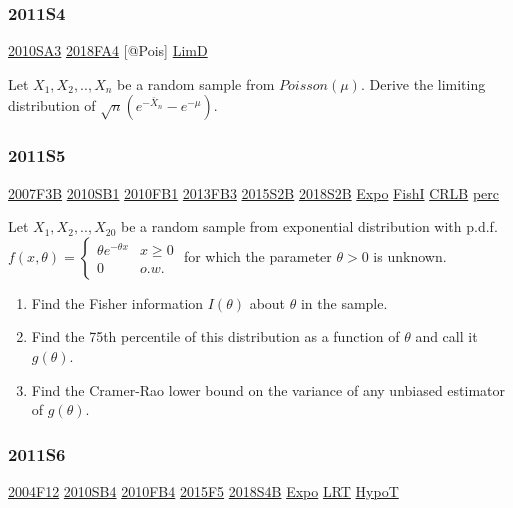 \documentclass[10pt,twocolumn,portrait]{article}
\begin{document}
\hypertarget{s4-2}{%
\subsubsection{2011S4}\label{s4-2}}

\protect\hyperlink{sa3-1}{2010SA3} \protect\hyperlink{fa4-4}{2018FA4}
{[}@Pois{]} \protect\hyperlink{LimD}{LimD}

Let \(X_1,X_2,..,X_n\) be a random sample from \(Poisson(\mu)\). Derive
the limiting distribution of \(\sqrt{n}(e^{-\bar X_n}-e^{-\mu})\).

\hypertarget{s5-2}{%
\subsubsection{2011S5}\label{s5-2}}

\protect\hyperlink{f3b}{2007F3B} \protect\hyperlink{sb1-1}{2010SB1}
\protect\hyperlink{fb1-1}{2010FB1} \protect\hyperlink{fb3-2}{2013FB3}
\protect\hyperlink{s2b-1}{2015S2B} \protect\hyperlink{s2b-2}{2018S2B}
\protect\hyperlink{Expo}{Expo} \protect\hyperlink{section-5}{FishI}
\protect\hyperlink{section-5}{CRLB} \protect\hyperlink{perc}{perc}

Let \(X_1,X_2,..,X_{20}\) be a random sample from exponential
distribution with p.d.f.
\(f(x,\theta)=\begin{cases}\theta e^{-\theta x}& x\ge0\\0& o.w.\end{cases}\)
for which the parameter \(\theta>0\) is unknown.

\begin{enumerate}
\def\labelenumi{(\alph{enumi})}
\item
  Find the Fisher information \(I(\theta)\) about \(\theta\) in the
  sample.
\item
  Find the 75th percentile of this distribution as a function of
  \(\theta\) and call it \(g(\theta)\).
\item
  Find the Cramer-Rao lower bound on the variance of any unbiased
  estimator of \(g(\theta)\).
\end{enumerate}

\hypertarget{s6-2}{%
\subsubsection{2011S6}\label{s6-2}}

\protect\hyperlink{f12}{2004F12} \protect\hyperlink{sb4}{2010SB4}
\protect\hyperlink{fb4-1}{2010FB4} \protect\hyperlink{f5-5}{2015F5}
\protect\hyperlink{s4b-2}{2018S4B} \protect\hyperlink{Expo}{Expo}
\protect\hyperlink{LRT}{LRT} \protect\hyperlink{HypoT}{HypoT}
\end{document}
